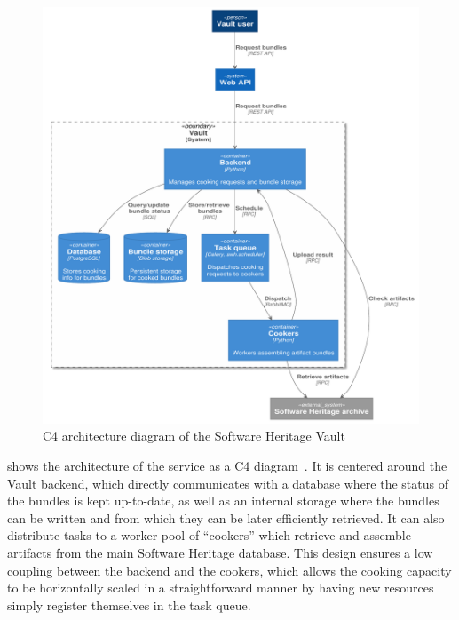 %     

\begin{figure}
  \centering
  \includegraphics[width=\linewidth]{img/vault/arch-container}
  \caption{C4 architecture diagram of the Software Heritage Vault}%
  \label{fig:vault-arch}
\end{figure}

 shows the architecture of the service as a C4
diagram~\cite{brown2018c4}. It is centered
around the Vault backend, which directly communicates with a database where the
status of the bundles is kept up-to-date, as well as an internal storage where
the bundles can be written and from which they can be later efficiently
retrieved. It can also distribute tasks to a worker pool of ``cookers'' which
retrieve and assemble artifacts from the main Software Heritage database.  This
design ensures a low coupling between the backend and the cookers, which allows
the cooking capacity to be horizontally scaled in a straightforward manner by
having new resources simply register themselves in the task queue.

